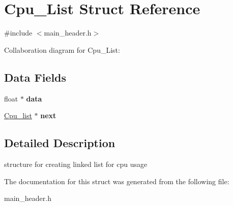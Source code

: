 \hypertarget{struct_cpu___list}{}\section{Cpu\+\_\+\+List Struct Reference}
\label{struct_cpu___list}


{\ttfamily \#include $<$main\+\_\+header.\+h$>$}



Collaboration diagram for Cpu\+\_\+\+List\+:
\subsection*{Data Fields}
\begin{DoxyCompactItemize}
\item 
float $\ast$ {\bfseries data}\hypertarget{struct_cpu___list_a57ba9c584cf7756552b7d4370e93395f}{}\label{struct_cpu___list_a57ba9c584cf7756552b7d4370e93395f}

\item 
\hyperlink{struct_cpu___list}{Cpu\+\_\+list} $\ast$ {\bfseries next}\hypertarget{struct_cpu___list_af0e00c9fbb15f23155e780956cf8b39b}{}\label{struct_cpu___list_af0e00c9fbb15f23155e780956cf8b39b}

\end{DoxyCompactItemize}


\subsection{Detailed Description}
structure for creating linked list for cpu usage 

The documentation for this struct was generated from the following file\+:\begin{DoxyCompactItemize}
\item 
main\+\_\+header.\+h\end{DoxyCompactItemize}

